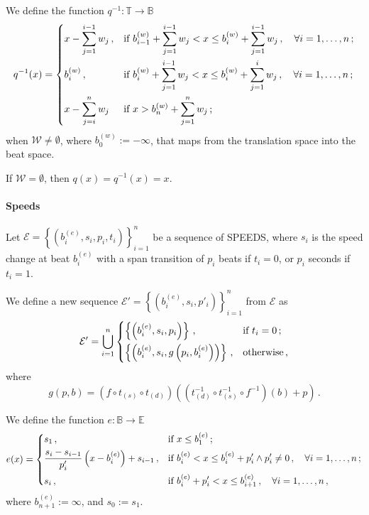 \documentclass[a4paper,9pt]{article}
\begin{document}
We define the function $ q^{-1}: \mathbb{T}\rightarrow \mathbb{B} $
\begin{equation}
	q^{-1}(x) = \begin{dcases}
		x - \sum_{j=1}^{i-1}w_j\,, & \text{if $ b^{(w)}_{i-1} + \sum_{j=1}^{i-1}w_j < x \leq b^{(w)}_i + \sum_{j=1}^{i-1}w_j\,, \quad \forall i=1,\dots,n$}\,;\\
		b^{(w)}_i\,, & \text{if $ b^{(w)}_i + \sum_{j=1}^{i-1}w_j < x \leq b^{(w)}_i + \sum_{j=1}^i w_j\,,\quad \forall i=1,\dots,n $}\,;\\
		x - \sum_{j=i}^n w_j & \text{if $ x > b^{(w)}_n + \sum_{j=1}^n w_j $}\,; 
	\end{dcases}
	\label{eq:q}
\end{equation}
when $ \mathcal{W} \neq \emptyset $, where $ b^{(w)}_0 := -\infty $, that maps from the translation space into the beat space.

If $ \mathcal{W} = \emptyset $, then $ q(x) = q^{-1}(x) = x$. 

\paragraph{Speeds}
Let $ \mathcal{E} =  \left\{\left( b_i^{(e)}, s_i, p_i, t_i \right)\right\}_{i=1}^{n} $ be a sequence of SPEEDS, where $ s_i $ is the speed change at beat $ b_i^{(e)} $ with a span transition of $ p_i $ beats if $ t_i = 0 $, or $ p_i $ seconds if $ t_i=1 $. 

We define a new sequence $ \mathcal{E'} =  \left\{\left( b_i^{(e)}, s_i, p'_i \right)\right\}_{i=1}^{n}$ from $ \mathcal{E} $ as
\begin{equation}
	\mathcal{E'} = \bigcup_{i=1}^{n} \begin{dcases}
		\left\{\left( b_i^{(e)}, s_i, p_i \right)\right\}\,, & \text{if $ t_i =0 $}\,;\\
		\left\{\left( b_i^{(e)}, s_i,g \left( p_i, b_i^{(e)} \right)  \right)\right\}\,, & \text{otherwise}\,,\\
	\end{dcases}
	\label{eq:eprime}
\end{equation}
where 
\begin{equation}
	g(p,b) =\left( f \circ t_{(s)} \circ t_{(d)}  \right)\left(  \left( t_{(d)}^{-1} \circ  t_{(s)}^{-1} \circ f^{-1} \right)(b) + p \right)\,.
	\label{eq:iureio}
\end{equation}

We define the function $ e:\mathbb{B}\rightarrow \mathbb{E} $
\begin{equation}
	e(x) = \begin{dcases}
		s_1\,, & \text{if $ x\leq b_1^{(e)} $}\,;\\
		\frac{s_i-s_{i-1}}{p'_i} \left( x-b_{i}^{(e)} \right)+s_{i-1} \,, & \text{if $ b_{i}^{(e)} < x \leq b_{i}^{(e)}+p'_i \land p'_i \neq 0\,,\quad \forall i=1,\dots,n$}\,;\\
		s_i\,, &\text{if $ b_{i}^{(e)}+p'_i < x \leq b_{i+1}^{(e)}\,,\quad \forall i=1,\dots,n$}\,,\\
	\end{dcases}
	\label{eq:e}
\end{equation}
where $ b_{n+1}^{(e)} := \infty $, and $ s_0 := s_1 $.
\end{document}
